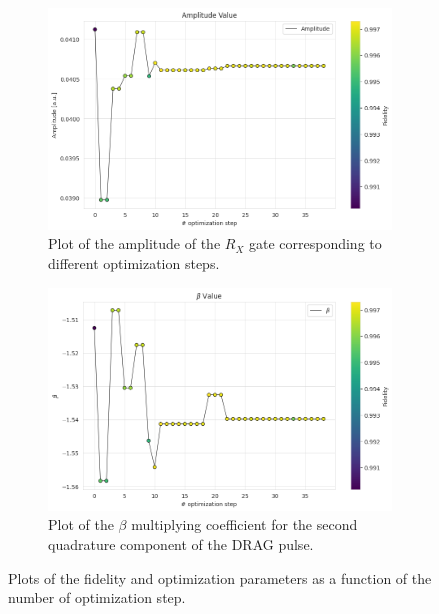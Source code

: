 \begin{figure}[h!]
    \begin{subfigure}[t]{0.45\textwidth}
        \includegraphics[width=\textwidth]{figures/png/RB_optimization/NM/post_ft_true/amplitude.png}
        \caption{Plot of the amplitude of the $R_X$ gate corresponding to different optimization steps.}
        \label{NM_true_fig:amplitude}
    \end{subfigure}
    \hfill
    \begin{subfigure}[t]{0.45\textwidth}
        \includegraphics[width=\textwidth]{figures/png/RB_optimization/NM/post_ft_true/beta.png}
        \caption{Plot of the $\beta$ multiplying coefficient for the second quadrature component of the DRAG pulse.}
        \label{NM_true_fig:beta}
    \end{subfigure}

    \caption{Plots of the fidelity and optimization parameters as a function of the number of optimization step.}
    \label{fig:NM_plots}
\end{figure}

